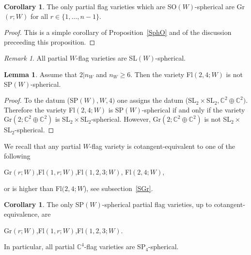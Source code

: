 \documentclass[12pt]{amsart}
\theoremstyle{definition}\newtheorem{theorem}{Theorem}[section]
\newtheorem{lemma}[proposition]{Lemma}
\newtheorem{corollary}[proposition]{Corollary}
\theoremstyle{definition}\newtheorem{definition}[proposition]{Definition}
\theoremstyle{remark}\newtheorem{example}[proposition]{Example}
\newtheorem{remark}[proposition]{Remark}
\begin{document}
\begin{corollary}\label{Cpflso} The only partial flag varieties which are SO$(W)$-spherical are Gr$(r; W)$ for all $r\in\{1,...,n-1\}$.\end{corollary}
\begin{proof}This is a simple corollary of Proposition~\ref{SphO} and of the discussion preceeding this proposition.\end{proof}
\begin{remark}\label{Rpflsl}All partial $W$-flag varieties are SL$(W)$-spherical.\end{remark}
\begin{lemma}Assume that $2|n_W$ and $n_W\ge6$. Then the variety Fl$(2,4; W)$ is not SP$(W)$-spherical.\end{lemma}
\begin{proof}To the datum (SP$(W), W, 4)$ one assigns the datum (SL$_2\times$SL$_2, \mathbb C^2\oplus\mathbb C^2)$. Therefore the variety Fl$(2,4; W)$ is SP$(W)$-spherical if and only if the variety Gr$(2; \mathbb C^2\oplus\mathbb C^2)$ is SL$_2\times$SL$_2$-spherical. However, Gr$(2; \mathbb C^2\oplus\mathbb C^2)$ is not SL$_2\times$SL$_2$-spherical.\end{proof}
We recall that any partial $W$-flag variety is cotangent-equivalent
to one of the following\begin{center}Gr$(r;
W)$,\hspace{10pt}Fl$(1,r; W)$,\hspace{10pt}Fl$(1,2,3;
W)$,\hspace{10pt} Fl$(2, 4; W)$,\end{center}or is higher than Fl$(2,
4; W$), see subsection~\ref{SGr}.
\begin{corollary}\label{Cpflsp}The only SP$(W)$-spherical partial flag varieties, up to cotangent-equivalence, are\begin{center}Gr$(r; W)$,\hspace{10pt}Fl$(1,r; W)$,\hspace{10pt}Fl$(1,2,3; W)$.\end{center}\end{corollary}In particular, all partial $\mathbb C^4$-flag varieties are SP$_4$-spherical.
\end{document}
